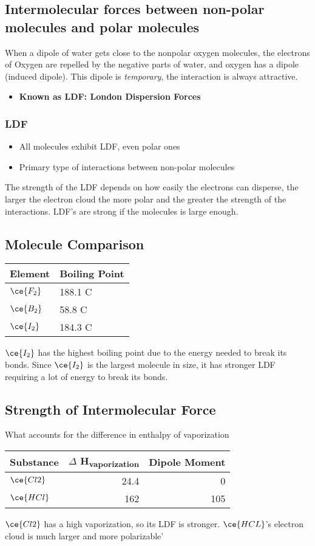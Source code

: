 \documentclass{scrartcl}
\begin{document}
\subsection{Intermolecular forces between non-polar molecules and polar molecules}
\label{sec:org6fdcff6}
When a dipole of water gets close to the nonpolar oxygen molecules, the electrons of Oxygen are repelled by the negative parts of water, and oxygen has a dipole (induced dipole). This dipole is \emph{temporary}, the interaction is always attractive.
\begin{itemize}
\item \textbf{Known as LDF: London Dispersion Forces}
\end{itemize}
\subsubsection{LDF}
\label{sec:org1f76ae0}
\begin{itemize}
\item All molecules exhibit LDF, even polar ones
\item Primary type of interactions between non-polar molecules
\end{itemize}
The strength of the LDF depends on how easily the electrons can disperse, the larger the electron cloud the more polar and the greater the strength of the interactions. LDF's are strong if the molecules is large enough.
\subsection{Molecule Comparison}
\label{sec:org9fd0ec2}
\begin{center}
\begin{tabular}{ll}
\toprule
Element & Boiling Point\\
\midrule
\(\ce{F_2}\) & 188.1\textdegree{} C\\
\(\ce{B_2}\) & 58.8\textdegree{} C\\
\(\ce{I_2}\) & 184.3\textdegree{} C\\
\bottomrule
\end{tabular}
\end{center}
\(\ce{I_2}\) has the highest boiling point due to the energy needed to break its bonds. Since \(\ce{I_2}\) is the largest molecule in size, it has stronger LDF requiring a lot of energy to break its bonds.
\subsection{Strength of Intermolecular Force}
\label{sec:orgf078507}
What accounts for the difference in enthalpy of vaporization
\begin{center}
\begin{tabular}{lrr}
\toprule
Substance & \(\Delta\) H\textsubscript{vaporization} & Dipole Moment\\
\midrule
\(\ce{Cl2}\) & 24.4 & 0\\
\(\ce{HCl}\) & 162 & 105\\
\bottomrule
\end{tabular}
\end{center}
\(\ce{Cl2}\) has a high vaporization, so its LDF is stronger. \(\ce{HCL}\)'s electron cloud is much larger and more polarizable'
\end{document}
